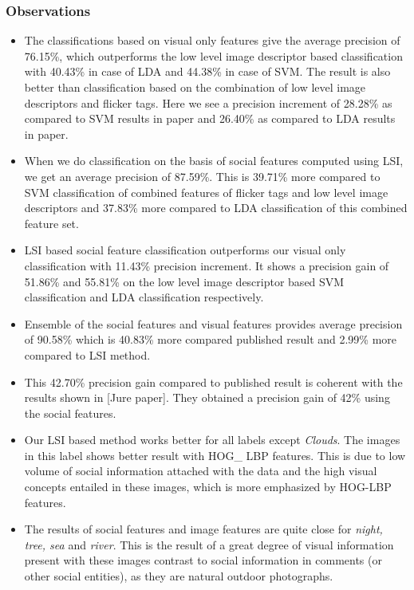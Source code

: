 \subsubsection*{Observations}
\begin{itemize}
\item The classifications based on visual only features give the average precision of 76.15\%, which outperforms the low level image descriptor based classification with 40.43\% in case of LDA and 44.38\% in case of SVM. The result is also better than classification based on the combination of low level image descriptors and flicker tags. Here we see a precision increment of 28.28\% as compared to SVM results in paper and 26.40\% as compared to LDA results in paper.
\item When we do classification on the basis of social features computed using LSI, we get an average precision of 87.59\%. This is 39.71\% more compared to SVM classification of combined features of flicker tags and low level image descriptors and  37.83\% more compared to LDA classification of this combined feature set.
\item LSI based social feature classification outperforms our visual only classification with 11.43\% precision increment.  It shows a precision gain of 51.86\% and 55.81\% on the low level image descriptor based SVM classification and LDA classification respectively.

\item Ensemble of the social features and visual features provides average precision of 90.58\% which is 40.83\% more compared published result and 2.99\% more compared to LSI method.

\item This 42.70\% precision gain compared to published result is coherent with the results shown in [Jure paper]. They obtained a precision gain of 42\% using the social features.

\item Our LSI based method works better for all labels except \textit{Clouds}. The images in this label shows better result with HOG\_ LBP features. This is due to low volume of social information attached with the data and the high visual concepts entailed in these images, which is more emphasized by HOG-LBP features.

\item The results of social features and image features are quite close for \textit{night, tree, sea} and \textit{river}. This is the result of a great degree of visual information present with these images contrast to social information in comments (or other social entities), as they are natural outdoor photographs.


\end{itemize}
